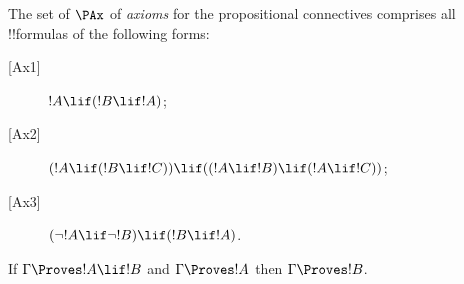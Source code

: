\documentclass[../../../include/open-logic-section]{subfiles}
\begin{document}


\begin{defn}[Axioms]
The set of $\PAx$ of \emph{axioms} for the propositional connectives comprises
all !!{formula}s of the following forms:
\begin{description}
\item[{[Ax1]}] $!A \lif (!B \lif !A)$;
\item[{[Ax2]}] $(!A \lif (!B \lif !C)) \lif
    ((!A \lif !B) \lif (!A \lif !C))$;
\item[{[Ax3]}] $(\lnot !A \lif \lnot !B) \lif (!B
    \lif !A)$.
\end{description}
\end{defn}

\begin{defn}
  If $\Gamma \Proves !A \lif !B$ and $\Gamma \Proves !A$ then $\Gamma
  \Proves !B$.
\end{defn}
\end{document}
